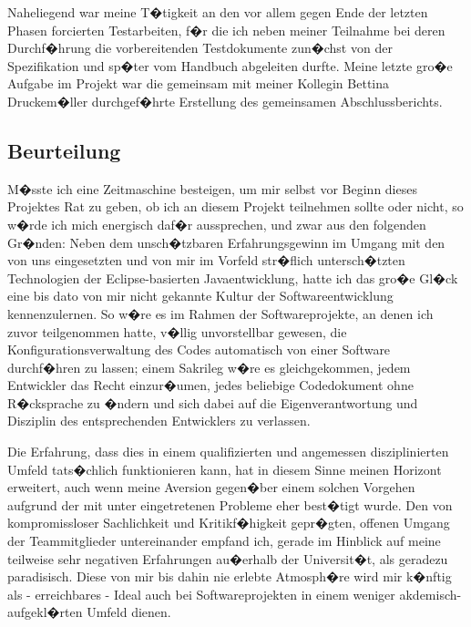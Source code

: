 \documentclass[a4paper,titlepage,12pt,ngerman]{scrbook}
\begin{document}
Naheliegend war meine T�tigkeit an den vor allem gegen Ende der letzten Phasen forcierten Testarbeiten, f�r die ich neben meiner 
Teilnahme bei deren Durchf�hrung die vorbereitenden Testdokumente zun�chst von der Spezifikation und sp�ter vom Handbuch abgeleiten 
durfte. Meine letzte gro�e Aufgabe im Projekt war die gemeinsam mit meiner Kollegin Bettina Druckem�ller durchgef�hrte Erstellung des 
gemeinsamen Abschlussberichts.\par

\subsection{Beurteilung}

M�sste ich eine Zeitmaschine besteigen, um mir selbst vor Beginn dieses Projektes Rat zu geben, ob ich an diesem
Projekt teilnehmen sollte oder nicht, so w�rde ich mich energisch daf�r aussprechen, und zwar aus den folgenden
Gr�nden: Neben dem unsch�tzbaren Erfahrungsgewinn im Umgang mit den von uns eingesetzten und von mir im Vorfeld 
str�flich untersch�tzten Technologien der Eclipse-basierten Javaentwicklung, hatte ich das gro�e Gl�ck eine bis
dato von mir nicht gekannte Kultur der Softwareentwicklung kennenzulernen. So w�re es im Rahmen der Softwareprojekte, 
an denen ich zuvor teilgenommen hatte, v�llig unvorstellbar gewesen, die Konfigurationsverwaltung des Codes automatisch
von einer Software durchf�hren zu lassen; einem Sakrileg w�re es gleichgekommen, jedem Entwickler das Recht
einzur�umen, jedes beliebige Codedokument ohne R�cksprache zu �ndern und sich dabei auf die Eigenverantwortung und 
Disziplin des entsprechenden Entwicklers zu verlassen.\par

Die Erfahrung, dass dies in einem qualifizierten und angemessen disziplinierten Umfeld tats�chlich funktionieren kann, 
hat in diesem Sinne meinen Horizont erweitert, auch wenn meine Aversion gegen�ber einem solchen Vorgehen aufgrund der mit 
unter eingetretenen Probleme eher best�tigt wurde. Den von kompromissloser Sachlichkeit und Kritikf�higkeit gepr�gten, 
offenen Umgang der Teammitglieder untereinander empfand ich, gerade im Hinblick auf meine teilweise sehr negativen Erfahrungen 
au�erhalb der Universit�t, als geradezu paradisisch. Diese von mir bis dahin nie erlebte Atmosph�re wird mir k�nftig als 
- erreichbares - Ideal auch bei Softwareprojekten in einem weniger akdemisch-aufgekl�rten Umfeld dienen.

\appendix
\end{document}

